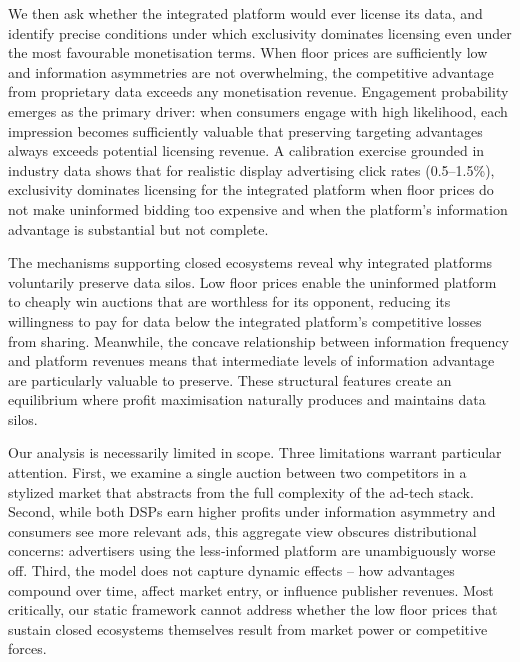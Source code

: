\noindent We then ask whether the integrated platform would ever license its data, and identify precise conditions under which exclusivity dominates licensing even under the most favourable monetisation terms. When floor prices are sufficiently low and information asymmetries are not overwhelming, the competitive advantage from proprietary data exceeds any monetisation revenue. Engagement probability emerges as the primary driver: when consumers engage with high likelihood, each impression becomes sufficiently valuable that preserving targeting advantages always exceeds potential licensing revenue. A calibration exercise grounded in industry data shows that for realistic display advertising click rates (0.5--1.5\%), exclusivity dominates licensing for the integrated platform when floor prices do not make uninformed bidding too expensive and when the platform's information advantage is substantial but not complete. \par
The mechanisms supporting closed ecosystems reveal why integrated platforms voluntarily preserve data silos. Low floor prices enable the uninformed platform to cheaply win auctions that are worthless for its opponent, reducing its willingness to pay for data below the integrated platform's competitive losses from sharing. Meanwhile, the concave relationship between information frequency and platform revenues means that intermediate levels of information advantage are particularly valuable to preserve. These structural features create an equilibrium where profit maximisation naturally produces and maintains data silos.\par

\noindent Our analysis is necessarily limited in scope. Three limitations warrant particular attention. First, we examine a single auction between two competitors in a stylized market that abstracts from the full complexity of the ad-tech stack. Second, while both DSPs earn higher profits under information asymmetry and consumers see more relevant ads, this aggregate view obscures distributional concerns: advertisers using the less-informed platform are unambiguously worse off. Third, the model does not capture dynamic effects -- how advantages compound over time, affect market entry, or influence publisher revenues. Most critically, our static framework cannot address whether the low floor prices that sustain closed ecosystems themselves result from market power or competitive forces.\par

